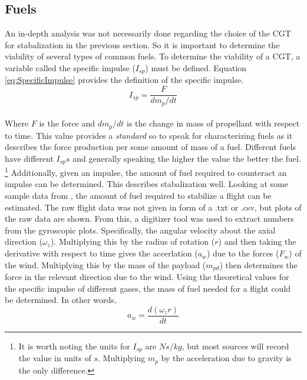 \subsection{Fuels}\label{sec:Fuels}
An in-depth analysis was not necessarily done regarding the choice of the CGT for stabalization in the previous section. So it is important to determine the viability of several types of common fuels. To determine the viability of a CGT, a variable called the specific impulse ($I_{sp}$) must be defined. Equation \ref{eq:SpecificImpulse} provides the definition of the specific impulse.
\begin{equation}\label{eq:SpecificImpulse}
I_{sp}=\frac{F}{dm_p/dt}
\end{equation}%
%
%
%
\\
Where $F$ is the force and $dm_p/dt$ is the change in mass of propellant with respect to time. This value provides a \textit{standard} so to speak for characterizing fuels as it describes the force production per some amount of mass of a fuel. Different fuels have different $I_{sp}s$ and generally speaking the higher the value the better the fuel. \footnote{It is worth noting the units for $I_{sp}$ are $Ns/kg$, but most sources will record the value in units of $s$. Multiplying $m_p$ by the acceleration due to gravity is the only difference.} Additionally, given an impulse, the amount of fuel required to counteract an impulse can be determined. This describes stabalization well. Looking at some sample data from \cite{titan1hab}, the amount of fuel required to stabilize a flight can be estimated. The raw flight data was not given in form of a .txt or .csv, but plots of the raw data are shown. From this, a digitizer tool was used to extract numbers from the gyroscopic plots. Specifically, the angular velocity about the axial direction ($\omega_z$). Multiplying this by the radius of rotation ($r$) and then taking the derivative with respect to time gives the accerlation ($a_w$) due to the forces ($F_w$) of the wind. Multiplying this by the mass of the payload ($m_{pd}$) then determines the force in the relevant direction due to the wind. Using the theoretical values for the specific impulse of different gases, the mass of fuel needed for a flight could be determined. In other words,
\begin{equation}\label{eq:alpha}
a_w = \frac{d(\omega_z r)}{dt}
\end{equation}%
